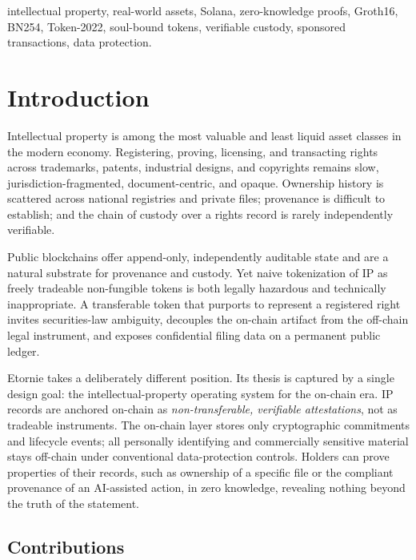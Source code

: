 \documentclass[conference]{IEEEtran}
\begin{document}
\begin{IEEEkeywords}
intellectual property, real-world assets, Solana, zero-knowledge proofs,
Groth16, BN254, Token-2022, soul-bound tokens, verifiable custody, sponsored
transactions, data protection.
\end{IEEEkeywords}

\section{Introduction}

Intellectual property is among the most valuable and least liquid asset
classes in the modern economy. Registering, proving, licensing, and
transacting rights across trademarks, patents, industrial designs, and
copyrights remains slow, jurisdiction-fragmented, document-centric, and
opaque. Ownership history is scattered across national registries and private
files; provenance is difficult to establish; and the chain of custody over a
rights record is rarely independently verifiable.

Public blockchains offer append-only, independently auditable state and are a
natural substrate for provenance and custody. Yet naive tokenization of IP as
freely tradeable non-fungible tokens is both legally hazardous and
technically inappropriate. A transferable token that purports to represent a
registered right invites securities-law ambiguity, decouples the on-chain
artifact from the off-chain legal instrument, and exposes confidential filing
data on a permanent public ledger.

Etornie takes a deliberately different position. Its thesis is captured by a
single design goal: the intellectual-property operating system for the
on-chain era. IP records are anchored on-chain as \emph{non-transferable,
verifiable attestations}, not as tradeable instruments. The on-chain layer
stores only cryptographic commitments and lifecycle events; all
personally identifying and commercially sensitive material stays off-chain
under conventional data-protection controls. Holders can prove properties of
their records, such as ownership of a specific file or the compliant
provenance of an AI-assisted action, in zero knowledge, revealing nothing
beyond the truth of the statement.

\subsection{Contributions}
\end{document}
